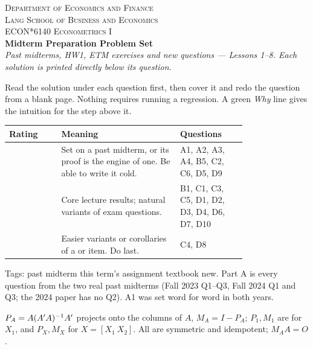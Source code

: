 \documentclass[11pt]{article}
\newcommand{\tagbox}[2]{\tcbox[on line, colback=#1, colframe=#1, coltext=white,
  boxsep=1pt, left=3pt, right=3pt, top=0pt, bottom=0pt, arc=1.5pt]{\scriptsize\sffamily\bfseries #2}}
\newcommand{\must}{\tagbox{examred}{$\star\star\star$ MUST}}
\newcommand{\likely}{\tagbox{likelyor}{$\star\star$ LIKELY}}
\newcommand{\opt}{\tagbox{gray!60}{$\star$ OPTIONAL}}
\newcommand{\examtag}[1]{\tagbox{examred!80!black}{EXAM #1}}
\newcommand{\hwtag}[1]{\tagbox{hwblue}{HW1 #1}}
\newcommand{\etmtag}[1]{\tagbox{gray!60}{ETM #1}}
\newcommand{\newtag}{\tagbox{qnavy!60}{NEW}}
\begin{document}
\begin{center}
  {\footnotesize\scshape Department of Economics and Finance\\
   Lang School of Business and Economics}\\[5pt]
  {\large\scshape ECON*6140 Econometrics I}\\[3pt]
  {\LARGE\bfseries\color{qnavy} Midterm Preparation Problem Set}\\[4pt]
  {\itshape Past midterms, HW1, ETM exercises and new questions --- Lessons 1--8.
  Each solution is printed directly below its question.}
\end{center}
\vspace{0.9em}

Read the solution under each question first, then cover it and redo the question from a
blank page. Nothing requires running a regression. A green \emph{Why} line gives the intuition
for the step above it.

\begin{center}
\renewcommand{\arraystretch}{1.3}
\begin{tabular}{@{}l p{0.5\linewidth} p{0.28\linewidth}@{}}
  \toprule
  Rating & Meaning & Questions \\
  \midrule
  \must & Set on a past midterm, or its proof is the engine of one. Be able to write it cold.
        & A1, A2, A3, A4, B5, C2, C6, D5, D9 \\
  \likely & Core lecture results; natural variants of exam questions.
        & B1, C1, C3, C5, D1, D2, D3, D4, D6, D7, D10 \\
  \opt & Easier variants or corollaries of a \must{} or \likely{} item. Do last.
        & C4, D8 \\
  \bottomrule
\end{tabular}
\end{center}
Tags: \examtag{} past midterm \quad \hwtag{} this term's assignment \quad \etmtag{} textbook
\quad \newtag{} new. Part A is every question from the two real past midterms (Fall 2023 Q1--Q3,
Fall 2024 Q1 and Q3; the 2024 paper has no Q2). A1 was set word for word in both years.

$P_{A} = A(A^{\prime} A)^{-1}A^{\prime}$ projects onto the columns of $A$, $M_{A} = I - P_{A}$;
$P_{1}, M_{1}$ are for $X_{1}$, and $P_{X}, M_{X}$ for $X = [X_{1}\ X_{2}]$. All are
symmetric and idempotent; $M_{A}A = O$.
\end{document}
